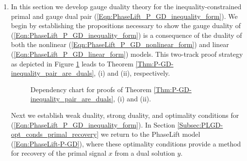 \begin{enumerate}


\item


In this section we develop gauge duality theory for the inequality-constrained primal and gauge dual pair (\ref{Eqn:PhaseLift_P_GD_inequality_form}).  We begin by establishing the propositions necessary to show the gauge duality of (\ref{Eqn:PhaseLift_P_GD_inequality_form}) is a consequence of the duality of both the nonlinear (\ref{Eqn:PhaseLift_P_GD_nonlinear_form}) and linear (\ref{Eqn:PhaseLift_P_GD_linear_form}) models.  This two-track proof strategy as depicted in Figure \ref{Fig:gauge_duality_thm_flowchart} leads to Theorem \ref{Thm:P-GD-inequality_pair_are_duals}, (i) and (ii), respectively.
\begin{figure}[H] 
\centering
\hspace{1cm}
\hspace{2cm}
\caption{Dependency chart for proofs of Theorem \ref{Thm:P-GD-inequality_pair_are_duals}, (i) and (ii).}
\label{Fig:gauge_duality_thm_flowchart}
\end{figure}

Next we establish weak duality, strong duality, and optimality conditions for (\ref{Eqn:PhaseLift_P_GD_inequality_form}).  In Section \ref{Subsec:PLGD-opt_conds_primal_recovery} we return to the PhaseLift model (\ref{Eqn:PhaseLift-P-GD}), where these optimality conditions provide a method for recovery of the primal signal $x$ from a dual solution $y$.



\end{enumerate}
